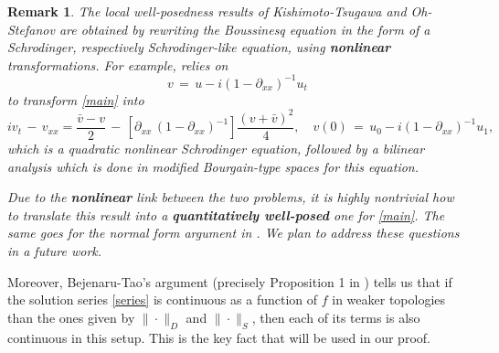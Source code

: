 \documentclass{amsart}
\newtheorem{remark}[theorem]{Remark}
\begin{document}
\begin{remark}
The local well-posedness results of Kishimoto-Tsugawa \cite{KT10} and Oh-Stefanov \cite{OS12} are obtained by rewriting the Boussinesq equation in the form of a Schrodinger, respectively Schrodinger-like equation, using \textbf{nonlinear} transformations. For example, \cite{KT10} relies on
\[
v\,=\,u - i(1 - \partial_{xx})^{-1} u_t\]
to transform \eqref{main} into
\[
 i v_{t} \,-\, v_{xx} = \frac{\bar{v}-v}{2}\, -
\,\left[\partial_{xx}\,(1 - \partial_{xx})^{-1}\right] \frac{(v + \bar{v})^{2}}{4}, \quad v(0)\,=\,u_0 - i(1 - \partial_{xx})^{-1} u_1,
\]
which is a quadratic nonlinear Schrodinger equation, followed by a bilinear analysis which is done in modified Bourgain-type spaces for this equation. 

Due to the \textbf{nonlinear} link between the two problems, it is highly nontrivial how to translate this result into a \textbf{quantitatively well-posed} one for \eqref{main}. The same goes for the normal form argument in  \cite{OS12}. We plan to address these questions in a future work.
\label{sw}
\end{remark}

Moreover, Bejenaru-Tao's argument (precisely Proposition 1 in \cite{BT06}) tells us that if the solution series \eqref{series} is continuous as a function of $f$ in  weaker topologies than the ones given by $\| \cdot\|_D$ and $\| \cdot \|_S$, then each of its terms is also continuous in this setup. This is the key fact  that will be used in our proof.
\end{document}
